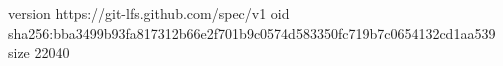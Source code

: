 version https://git-lfs.github.com/spec/v1
oid sha256:bba3499b93fa817312b66e2f701b9c0574d583350fc719b7c0654132cd1aa539
size 22040
